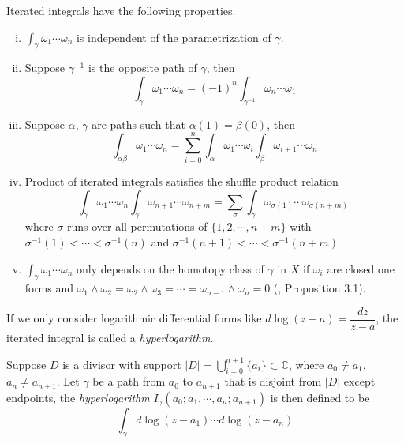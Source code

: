 \begin{proposition}\label{prop: basic properties of iterated integrals}\cite{Hain_TheGeometryOfTheMixedHodgeStructureOnTheFundamentalGroup}
Iterated integrals have the following properties.
\begin{enumerate}[i.]
\item $\displaystyle\int_\gamma\omega_1\cdots\omega_n$ is independent of the parametrization of $\gamma$.
\item Suppose $\gamma^{-1}$ is the opposite path of $\gamma$, then
\begin{equation}
\int_\gamma\omega_1\cdots\omega_n=(-1)^n\int_{\gamma^{-1}}\omega_n\cdots\omega_1
\end{equation}
\item Suppose $\alpha$, $\gamma$ are paths such that $\alpha(1)=\beta(0)$, then
\begin{equation}
\int_{\alpha\beta}\omega_1\cdots\omega_n=\sum_{i=0}^n\int_\alpha\omega_1\cdots\omega_i\int_\beta\omega_{i+1}\cdots\omega_n
\end{equation}
\item Product of iterated integrals satisfies the shuffle product relation
\begin{equation}
\int_\gamma\omega_1\cdots\omega_n\int_\gamma\omega_{n+1}\cdots\omega_{n+m}=\sum_\sigma\int_\gamma\omega_{\sigma(1)}\cdots\omega_{\sigma(n+m)}.
\end{equation}
where $\sigma$ runs over all permutations of $\{1,2,\cdots,n+m\}$ with $\sigma^{-1}(1)<\cdots<\sigma^{-1}(n)$ and $\sigma^{-1}(n+1)<\cdots<\sigma^{-1}(n+m)$
\item $\displaystyle\int_\gamma\omega_1\cdots\omega_n$ only depends on the homotopy class of $\gamma$ in $X$ if $\omega_i$ are closed one forms and $\omega_1\wedge\omega_2=\omega_2\wedge\omega_3=\cdots=\omega_{n-1}\wedge\omega_n=0$ (\cite{Hain_TheGeometryOfTheMixedHodgeStructureOnTheFundamentalGroup}, Proposition 3.1).
\end{enumerate}
\end{proposition}

If we only consider logarithmic differential forms like $d\log(z-a)=\dfrac{dz}{z-a}$, the iterated integral is called a \textit{hyperlogarithm}.

\begin{definition}
Suppose $D$ is a divisor with support $|D|=\bigcup_{i=0}^{n+1}\{a_i\}\subset\mathbb C$, where $a_0\neq a_1$, $a_n\neq a_{n+1}$. Let $\gamma$ be a path from $a_0$ to $a_{n+1}$ that is disjoint from $|D|$ except endpoints, the \textit{hyperlogarithm} $I_\gamma(a_0;a_1,\cdots,a_n;a_{n+1})$ is then defined to be
\begin{equation}\label{eq: itegrated integral def of hyperlog}
\int_\gamma d\log(z-a_1)\cdots d\log(z-a_n)
\end{equation}
\end{definition}

